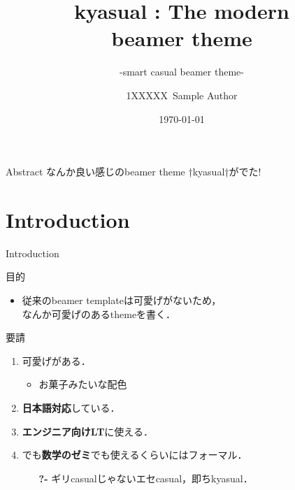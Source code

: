 \documentclass[aspectratio=1610,14pt]{beamer}
\title{%
    kyasual : The modern\\ beamer theme
}
\subtitle{
    -smart casual beamer theme-
}
\author{%
    1XXXXX\ Sample Author
}
\institute[Sample Univ.]{%
    Sample Univ. 
}
\date{%
    \today
}
\begin{document}
%
%
\begin{frame}
\maketitle 
\end{frame}

\begin{frame}[fragile]{Abstract}
        なんか良い感じのbeamer theme †\alert{kyasual}†がでた!
\end{frame}

\section{Introduction}

\begin{frame}
    \tableofcontents[currentsection]
\end{frame}

\begin{frame}{Introduction}
    \begin{textblock}{目的}
        \begin{itemize}
            \item{従来のbeamer templateは可愛げがないため，\\なんか\alert{可愛げのある}themeを書く．}
        \end{itemize}
    \end{textblock}
    \begin{textblock}{要請}
        \begin{enumerate}
            \item{\alert{可愛げがある．}}
                \begin{itemize}
                    \item{お菓子みたいな配色}
                \end{itemize}
            \item{\textbf{日本語対応}している．}
            \item{\textbf{エンジニア向けLT}に使える．}
            \item{でも\textbf{数学のゼミ}でも使えるくらいには\alert{フォーマル}．}
                \begin{itemize}
                    \item[\textbf{?-}]{ギリcasualじゃないエセcasual，即ちkyasual．}
                        \begin{itemize}
                        \end{itemize}
                \end{itemize}
        \end{enumerate}
    \end{textblock}
\end{frame}
\end{document}
